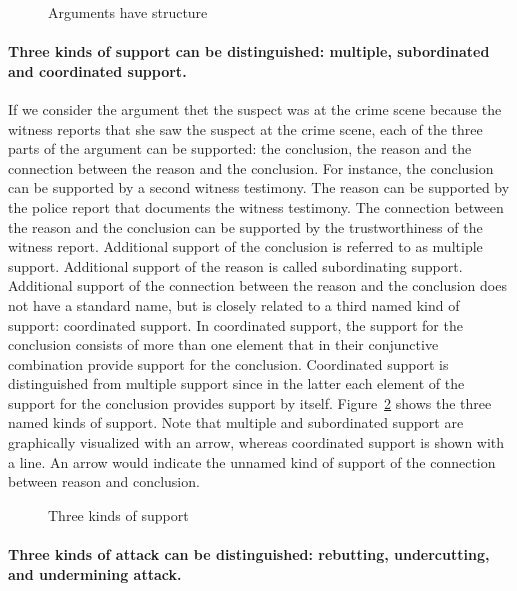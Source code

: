 \documentclass[10pt]{article}
\begin{document}
\begin{figure}[bt]
\centering

\caption{Arguments have structure\label{fig:arg2}}
\end{figure}

\paragraph{Three kinds of support can be distinguished: multiple, subordinated and coordinated support.}

If we consider the argument thet the suspect was at the crime scene because the witness reports that she saw the suspect at the crime scene, each of the three parts of the argument can be supported: the conclusion, the reason and the connection between the reason and the conclusion. For instance, the conclusion can be supported by a second witness testimony. The reason can be supported by the police report that documents the witness testimony. The connection between the reason and the conclusion can be supported by the trustworthiness of the witness report. Additional support of the conclusion is referred to as multiple support. Additional support of the reason is called subordinating support. Additional support of the connection between the reason and the conclusion does not have a standard name, but is closely related to a third named kind of support: coordinated support. In coordinated support, the support for the conclusion consists of more than one element that in their conjunctive combination provide support for the conclusion. Coordinated support is distinguished from multiple support since in the latter each element of the support for the conclusion provides support by itself. Figure~\ref{fig:support} shows the three named kinds of support. Note that multiple and subordinated support are graphically visualized with an arrow, whereas coordinated support is shown with a line. An arrow would indicate the unnamed kind of support of the connection between reason and conclusion.

\begin{figure}[bt]
\centering

\caption{Three kinds of support\label{fig:support}}
\end{figure}



\paragraph{Three kinds of attack can be distinguished: rebutting, undercutting, and undermining attack.}
\end{document}
